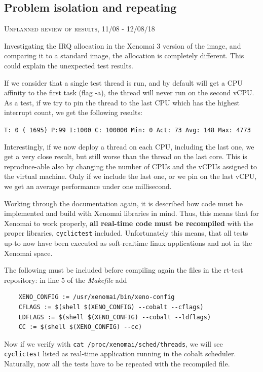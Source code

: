 \documentclass[]{scrartcl}
\begin{document}
\subsection{Problem isolation and repeating}
\label{sec:isol}

{\small\textsc{Unplanned review of results, 11/08 - 12/08/18} \bigskip}

Investigating the IRQ allocation in the Xenomai 3 version of the image, and comparing it to a standard image, the allocation is completely different. This could explain the unexpected test results.

If we consider that a single test thread is run, and by default will get a CPU affinity to the first task (flag -a), the thread will never run on the second vCPU. As a test, if we try to pin the thread to the last CPU which has the highest interrupt count, we get the following results:
\bigskip

\noindent \small \texttt{T: 0 ( 1695) P:99 I:1000 C: 100000 Min:      0 Act:   73 Avg:  148 Max:    4773}

Interestingly, if we now deploy a thread on each CPU, including the last one, we get a very close result, but still worse than the thread on the last core. This is reproduce-able also by changing the number of CPUs and the vCPUs assigned to the virtual machine. Only if we include the last one, or we pin on the last vCPU, we get an average performance under one millisecond.

Working through the documentation again, it is described how code must be implemented and build with Xenomai libraries in mind. Thus, this means that for Xenomai to work properly, \textbf{all real-time code must be recompiled} with the proper libraries, \texttt{cyclictest} included. Unfortunately this means, that all tests up-to now have been executed as soft-realtime linux applications and not in the Xenomai space.

The following must be included before compiling again the files in the rt-test repository: in line 5 of the \textit{Makefile} add

\begin{verbatim}
	XENO_CONFIG := /usr/xenomai/bin/xeno-config
	CFLAGS := $(shell $(XENO_CONFIG) --cobalt --cflags)
	LDFLAGS := $(shell $(XENO_CONFIG) --cobalt --ldflags)
	CC := $(shell $(XENO_CONFIG) --cc)
\end{verbatim}

Now if we verify with \texttt{cat /proc/xenomai/sched/threads}, we will see \texttt{cyclictest} listed as real-time application running in the cobalt scheduler.
Naturally, now all the tests have to be repeated with the recompiled file.
\end{document}
